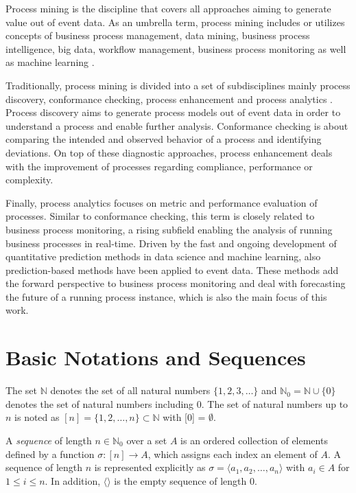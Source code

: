 Process mining is the discipline that covers all approaches aiming to generate value out of event data.
As an umbrella term, process mining includes or utilizes concepts of business process management, data mining, business process intelligence, big data, workflow management, business process monitoring \cite{DBLP:books/sp/Aalst16} as well as machine learning \cite{DBLP:conf/bpm/VeitGMHT17}.

Traditionally, process mining is divided into a set of subdisciplines mainly process discovery, conformance checking, process enhancement and process analytics \cite{DBLP:conf/caise/EckLLA15}.
Process discovery aims to generate process models out of event data in order to understand a process and enable further analysis.
Conformance checking is about comparing the intended and observed behavior of a process and identifying deviations.
On top of these diagnostic approaches, process enhancement deals with the improvement of processes regarding compliance, performance or complexity.

Finally, process analytics focuses on metric and performance evaluation of processes. Similar to conformance checking, this term is closely related to business process monitoring, a rising subfield enabling the analysis of running business processes in real-time.
Driven by the fast and ongoing development of quantitative prediction methods in data science and machine learning, also prediction-based methods have been applied to event data.
These methods add the forward perspective to business process monitoring and deal with forecasting the future of a running process instance, which is also the main focus of this work.


\section{Basic Notations and Sequences}

The set $\mathbb{N}$ denotes the set of all natural numbers $\{1, 2, 3, \dots\}$ and $\mathbb{N}_0 = \mathbb{N} \cup \{0\}$ denotes the set of natural numbers including 0.
The set of natural numbers up to $n$ is noted as $[n] = \{1, 2, \dots, n\} \subset \mathbb{N}$ with [0] = $\emptyset$.

\begin{definition}[Sequence]
		A \textit{sequence} of length $n \in \mathbb{N}_0$ over a set $A$ is an ordered collection of elements defined by a function $\sigma \colon [n]\to A$, which assigns each index an element of $A$.
		A sequence  of length $n$ is represented explicitly as $\sigma = \langle a_1, a_2, \dots, a_n\rangle $ with $a_i \in A$ for $1 \leq i \leq n$. In addition, $\langle \rangle$ is the empty sequence of length $0$.
\end{definition}

